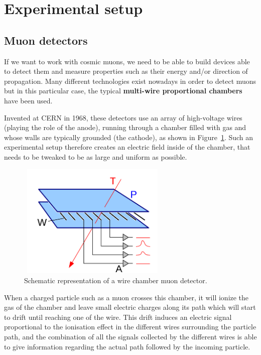 \documentclass[a4paper, 11pt, twoside, openright]{report}
\begin{document}
\section{Experimental setup} \label{sec:setup}

\subsection{Muon detectors} \label{sec:muonDetectors}

If we want to work with cosmic muons, we need to be able to build devices able to detect them and measure properties such as their energy and/or direction of propagation. Many different technologies exist nowadays in order to detect muons but in this particular case, the typical \textbf{multi-wire proportional chambers} have been used.

Invented at CERN in 1968, these detectors use an array of high-voltage wires (playing the role of the anode), running through a chamber filled with gas and whose walls are typically grounded (the cathode), as shown in Figure~\ref{fig:wireChambers}. Such an experimental setup therefore creates an electric field inside of the chamber, that needs to be tweaked to be as large and uniform as possible.

\begin{figure}[htbp]
\begin{center}
\includegraphics[width=7.2cm, height=5.5cm]{figs/wireChambers.png}
\caption{Schematic representation of a wire chamber muon detector.}
\label{fig:wireChambers}
\end{center}
\end{figure}

When a charged particle such as a muon crosses this chamber, it will ionize the gas of the chamber and leave small electric charges along its path which will start to drift until reaching one of the wire. This drift induces an electric signal proportional to the ionisation effect in the different wires surrounding the particle path, and the combination of all the signals collected by the different wires is able to give information regarding the actual path followed by the incoming particle.	
\end{document}
